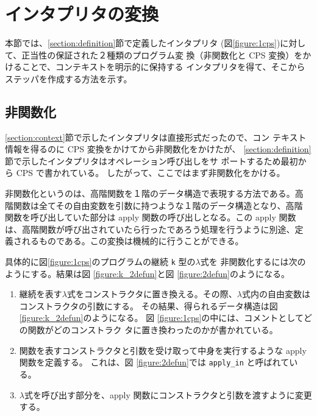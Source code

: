 \section{インタプリタの変換}
\label{section:transform}

本節では、\ref{section:definition}節で定義したインタプリタ
(図\ref{figure:1cps})に対して、正当性の保証された２種類のプログラム変
換（非関数化と CPS 変換）をかけることで、コンテキストを明示的に保持する
インタプリタを得て、そこからステッパを作成する方法を示す。


\subsection{非関数化}
\label{section:2defun}

\ref{section:context}節で示したインタプリタは直接形式だったので、コン
テキスト情報を得るのに CPS 変換をかけてから非関数化をかけたが、
\ref{section:definition}節で示したインタプリタはオペレーション呼び出しをサ
ポートするため最初から CPS で書かれている。
したがって、ここではまず非関数化をかける。

非関数化というのは、高階関数を１階のデータ構造で表現する方法である。高
階関数は全てその自由変数を引数に持つような１階のデータ構造となり、高階
関数を呼び出していた部分は apply 関数の呼び出しとなる。この apply 関数
は、高階関数が呼び出されていたら行ったであろう処理を行うように別途、定
義されるものである。この変換は機械的に行うことができる。

具体的に図\ref{figure:1cps}のプログラムの継続 \texttt{k} 型の$\lambda$式を
非関数化するには次のようにする。結果は図 \ref{figure:k_2defun}と図 \ref{figure:2defun}のようになる。

\begin{enumerate}
\item 継続を表す$\lambda$式をコンストラクタに置き換える。その際、$\lambda$式内の自由変数はコンストラクタの引数にする。
その結果、得られるデータ構造は図 \ref{figure:k_2defun}のようになる。
図 \ref{figure:1cps}の中には、コメントとしてどの関数がどのコンストラク
タに置き換わったのかが書かれている。
\item 関数を表すコンストラクタと引数を受け取って中身を実行するような apply 関数を定義する。
これは、図 \ref{figure:2defun}では \texttt{apply\_in} と呼ばれている。
\item $\lambda$式を呼び出す部分を、apply 関数にコンストラクタと引数を渡すように変更する。
\end{enumerate}

